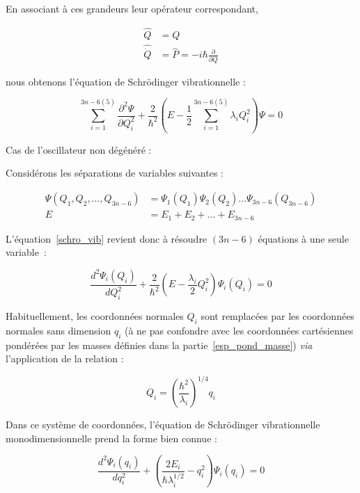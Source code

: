 En associant à ces grandeurs leur opérateur correspondant,

\begin{align}
\hat{Q} &= Q \\
\hat{\dot{Q}} &= \hat{P} = -i\hbar \frac{\partial}{\partial Q}
\end{align}

\noindent nous obtenons l'équation de Schr\"{o}dinger vibrationnelle :

\begin{equation}
\sum^{3n-6(5)}_{i=1} \frac{\partial^2 \Psi}{\partial Q^2_i} + \frac{2}{\hbar^2}\left(E - \frac{1}{2} \sum^{3n-6(5)}_{i=1} \lambda_i Q^2_i\right) \Psi = 0
\label{schro_vib}
\end{equation}

Cas de l'oscillateur non dégénéré :

Considérons les séparations de variables suivantes :

\begin{align}
	\Psi(Q_1,Q_2,\ldots,Q_{3n-6}) &= \Psi_1(Q_1) \Psi_2(Q_2)\ldots \Psi_{3n-6}(Q_{3n-6}) \\
	E &= E_1 +E_2 + \ldots + E_{3n-6}
\end{align}

L'équation~\ref{schro_vib} revient donc à résoudre $(3n-6)$ équations à une seule variable~:

\begin{equation}
 \frac{d^2 \Psi_i(Q_i)}{dQ^2_i} + \frac{2}{\hbar^2}\left(E - \frac{\lambda_i}{2} Q^2_i\right) \Psi_i\left(Q_i\right) = 0	
\end{equation}

Habituellement, les coordonnées normales $Q_i$ sont remplacées par les coordonnées normales sans dimension $q_i$ (à ne pas confondre avec les coordonnées cartésiennes pondérées par les masses définies dans la partie~\ref{esp_pond_masse}) \textit{via} l'application de la relation :

\begin{equation}
	Q_i = \left(\frac{\hbar^2}{\lambda_i}\right)^{1/4} q_i
\end{equation}

Dans ce système de coordonnées, l'équation de Schr\"{o}dinger vibrationnelle monodimensionnelle prend la forme bien connue :

\begin{equation}
	 \frac{d^2 \Psi_i(q_i)}{dq^2_i} + \left(\frac{2E_i}{\hbar\lambda^{1/2}_i} - q^2_i\right) \Psi_i\left(q_i\right) = 0	
\end{equation}

